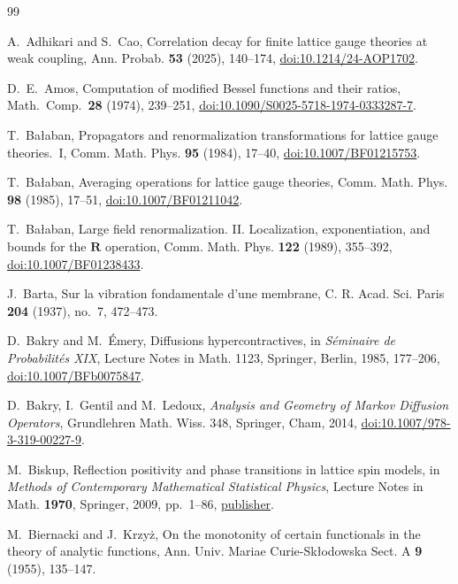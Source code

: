 \begin{thebibliography}{99}

A.~Adhikari and S.~Cao, Correlation decay for finite lattice gauge theories at weak coupling, Ann. Probab. \textbf{53} (2025), 140--174, \href{https://doi.org/10.1214/24-AOP1702}{doi:10.1214/24-AOP1702}.

D.~E.~Amos, Computation of modified Bessel functions and their ratios, Math.\ Comp.\ \textbf{28} (1974), 239--251, \href{https://doi.org/10.1090/S0025-5718-1974-0333287-7}{doi:10.1090/S0025-5718-1974-0333287-7}.

T.~Ba{\l}aban, Propagators and renormalization transformations for lattice
gauge theories.~I, Comm. Math. Phys. \textbf{95} (1984), 17--40,
\href{https://doi.org/10.1007/BF01215753}{doi:10.1007/BF01215753}.

T.~Ba{\l}aban, Averaging operations for lattice gauge theories, Comm. Math.
Phys. \textbf{98} (1985), 17--51,
\href{https://doi.org/10.1007/BF01211042}{doi:10.1007/BF01211042}.

T.~Ba{\l}aban, Large field renormalization. II. Localization,
exponentiation, and bounds for the $\mathbf R$ operation, Comm. Math. Phys.
\textbf{122} (1989), 355--392,
\href{https://doi.org/10.1007/BF01238433}{doi:10.1007/BF01238433}.

J.~Barta, Sur la vibration fondamentale d'une membrane, C. R. Acad. Sci. Paris \textbf{204} (1937), no.~7, 472--473.

D.~Bakry and M.~\'Emery, Diffusions hypercontractives, in \emph{S\'eminaire
de Probabilit\'es XIX}, Lecture Notes in Math. 1123, Springer, Berlin, 1985,
177--206, \href{https://doi.org/10.1007/BFb0075847}{doi:10.1007/BFb0075847}.

D.~Bakry, I.~Gentil and M.~Ledoux, \emph{Analysis and Geometry of Markov
Diffusion Operators}, Grundlehren Math. Wiss. 348, Springer, Cham, 2014,
\href{https://doi.org/10.1007/978-3-319-00227-9}{doi:10.1007/978-3-319-00227-9}.

M.~Biskup, Reflection positivity and phase transitions in lattice spin models,
in \emph{Methods of Contemporary Mathematical Statistical Physics},
Lecture Notes in Math. \textbf{1970}, Springer, 2009, pp.~1--86,
\href{https://doi.org/10.1007/978-3-540-92796-9_1}{publisher}.

M.~Biernacki and J.~Krzy\.z, On the monotonity of certain functionals in the theory of analytic functions, Ann. Univ. Mariae Curie-Sk{\l}odowska Sect. A \textbf{9} (1955), 135--147.


\end{thebibliography}
